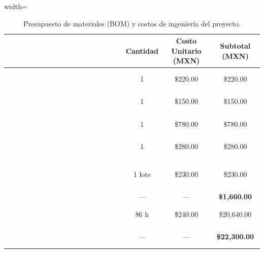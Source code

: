 \documentclass[12pt, letterpaper]{article}
\begin{document}
\begin{table}[H]
    \centering
    \renewcommand{\arraystretch}{1.2}
    \small
    \caption{Presupuesto de materiales (BOM) y costos de ingeniería del proyecto.}
    \label{tab:costos_proyecto}
    \begin{adjustbox}{width=\textwidth}
    \begin{tabular}{|m{5.5cm}|c|c|c|}
        \hline
        \cellcolor{MidnightBlue!80}
        \textcolor{white}{\textbf{Concepto/Componente}} & \cellcolor{NavyBlue!60} \textbf{Cantidad} & \cellcolor{NavyBlue!60}\textbf{Costo Unitario (MXN)} & \cellcolor{NavyBlue!60}\textbf{Subtotal (MXN)} \\
        \hline
        \cellcolor{MidnightBlue!80}
        \textcolor{white}{Tarjeta de desarrollo Seeed Studio XIAO ESP32-S3} & 1 & \$220.00 & \$220.00 \\
        \hline
        \cellcolor{MidnightBlue!80}
        \textcolor{white}{Módulo receptor GNSS u-blox NEO-6M con antena} & 1 & \$150.00 & \$150.00 \\
        \hline
        \cellcolor{MidnightBlue!80}
        \textcolor{white}{Tarjeta SBC Orange Pi Zero 2W + fuente USB-C y microSD} & 1 & \$780.00 & \$780.00 \\
        \hline
        \cellcolor{MidnightBlue!80}
        \textcolor{white}{Pantalla TFT LCD táctil SPI $2.8''$ (ILI9341 / XPT2046)} & 1 & \$280.00 & \$280.00 \\
        \hline
        \cellcolor{MidnightBlue!80}
        \textcolor{white}{Batería LiPo ($3.7\text{ V}$), cargador TP4056, LEDs, pulsador y cableado} & 1 lote & \$230.00 & \$230.00 \\
        \hline
        \cellcolor{MidnightBlue!80}
        \textcolor{white}{\textbf{Subtotal de Materiales (BOM)}} & \cellcolor{NavyBlue!60} --- & \cellcolor{NavyBlue!60} --- & \cellcolor{NavyBlue!60} \textbf{\$1,660.00} \\
        \hline
        \cellcolor{MidnightBlue!80}
        \textcolor{white}{Ingeniería de firmware, nodo borde e integración (50 horas)} & 86 h & \$240.00 & \$20,640.00 \\
        \hline
        \cellcolor{MidnightBlue!80}
        \textcolor{white}{\textbf{Costo Total Estimado del Prototipo}} & \cellcolor{NavyBlue!60} --- & \cellcolor{NavyBlue!60} --- & \cellcolor{NavyBlue!60} \textbf{\$22,300.00} \\
        \hline
    \end{tabular}
    \end{adjustbox}
\end{table}
\end{document}
